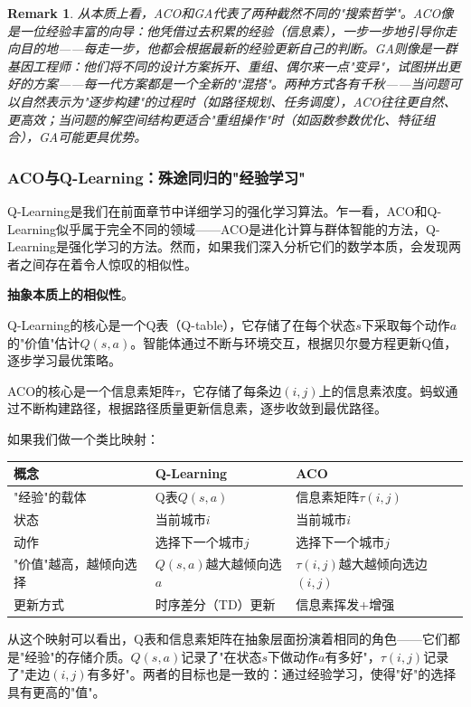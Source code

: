 \documentclass[lang=cn,zihao=-4,a4paper,fontset=windows]{beautybook}
\newtheorem*{remark}{\textbf{Remark}}
\begin{document}
\begin{remark}
从本质上看，ACO和GA代表了两种截然不同的"搜索哲学"。ACO像是一位经验丰富的向导：他凭借过去积累的经验（信息素），一步一步地引导你走向目的地——每走一步，他都会根据最新的经验更新自己的判断。GA则像是一群基因工程师：他们将不同的设计方案拆开、重组、偶尔来一点"变异"，试图拼出更好的方案——每一代方案都是一个全新的"混搭"。两种方式各有千秋——当问题可以自然表示为"逐步构建"的过程时（如路径规划、任务调度），ACO往往更自然、更高效；当问题的解空间结构更适合"重组操作"时（如函数参数优化、特征组合），GA可能更具优势。
\end{remark}

\subsubsection{ACO与Q-Learning：殊途同归的"经验学习"}

Q-Learning是我们在前面章节中详细学习的强化学习算法。乍一看，ACO和Q-Learning似乎属于完全不同的领域——ACO是进化计算与群体智能的方法，Q-Learning是强化学习的方法。然而，如果我们深入分析它们的数学本质，会发现两者之间存在着令人惊叹的相似性。

\textbf{抽象本质上的相似性}。

Q-Learning的核心是一个Q表（Q-table），它存储了在每个状态$s$下采取每个动作$a$的"价值"估计$Q(s,a)$。智能体通过不断与环境交互，根据贝尔曼方程更新Q值，逐步学习最优策略。

ACO的核心是一个信息素矩阵$\tau$，它存储了每条边$(i,j)$上的信息素浓度。蚂蚁通过不断构建路径，根据路径质量更新信息素，逐步收敛到最优路径。

如果我们做一个类比映射：
\begin{center}
\begin{tabular}{lll}
\toprule
\textbf{概念} & \textbf{Q-Learning} & \textbf{ACO} \\
\midrule
"经验"的载体 & Q表$Q(s,a)$ & 信息素矩阵$\tau(i,j)$ \\
\hline
状态 & 当前城市$i$ & 当前城市$i$ \\
\hline
动作 & 选择下一个城市$j$ & 选择下一个城市$j$ \\
\hline
"价值"越高，越倾向选择 & $Q(s,a)$越大越倾向选$a$ & $\tau(i,j)$越大越倾向选边$(i,j)$ \\
\hline
更新方式 & 时序差分（TD）更新 & 信息素挥发+增强 \\
\bottomrule
\end{tabular}
\end{center}

从这个映射可以看出，Q表和信息素矩阵在抽象层面扮演着相同的角色——它们都是"经验"的存储介质。$Q(s,a)$记录了"在状态$s$下做动作$a$有多好"，$\tau(i,j)$记录了"走边$(i,j)$有多好"。两者的目标也是一致的：通过经验学习，使得"好"的选择具有更高的"值"。
\end{document}
